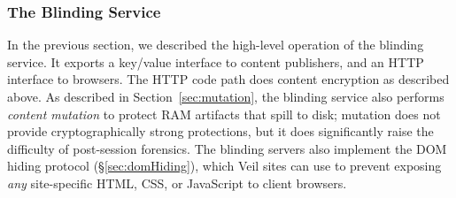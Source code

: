 \subsubsection{The Blinding Service}
\label{sec:bservs}

In the previous section, we described the
high-level operation of the blinding service.
It exports a key/value interface to content
publishers, and an HTTP interface to browsers.
The HTTP code path does content encryption
as described above. As described in
Section~\ref{sec:mutation}, the blinding
service also performs \emph{content mutation}
to protect RAM artifacts that spill to disk;
mutation does not provide cryptographically
strong protections, but it does significantly
raise the difficulty of post-session forensics.
The blinding servers also implement the DOM
hiding protocol (\S\ref{sec:domHiding}), which
Veil sites can use to prevent exposing \emph{any}
site-specific HTML, CSS, or JavaScript to client
browsers.



